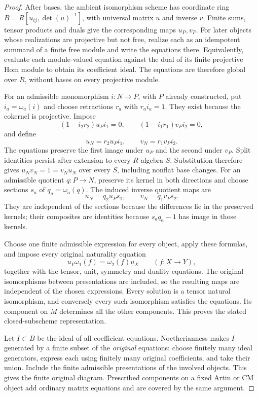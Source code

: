 \begin{proof}
After bases, the ambient isomorphism scheme has coordinate ring
$B=R[u_{ij},\det(u)^{-1}]$, with universal matrix $u$ and inverse
$v$. Finite sums, tensor products and duals give the corresponding
maps $u_P,v_P$. For later objects whose realizations are projective
but not free, realize each as an idempotent summand of a finite
free module and write the equations there. Equivalently, evaluate
each module-valued equation against the dual of its finite
projective Hom module to obtain its coefficient ideal. The
equations are therefore global over $R$, without bases on every
projective module.

For an admissible monomorphism $i:N\to P$, with $P$ already
constructed, put $i_a=\omega_a(i)$ and choose retractions $r_a$
with $r_ai_a=1$. They exist because the cokernel is projective.
Impose
\[
 (1-i_2r_2)u_Pi_1=0,\qquad
 (1-i_1r_1)v_Pi_2=0,
 \tag{E.2.12a}
\]
and define
\[
 u_N=r_2u_Pi_1,\qquad v_N=r_1v_Pi_2.
 \tag{E.2.12b}
\]
The equations preserve the first image under $u_P$ and the
second under $v_P$. Split identities persist after extension to
every $R$-algebra $S$. Substitution therefore gives
$u_Nv_N=1=v_Nu_N$ over every $S$, including nonflat base changes.
For an admissible quotient $q:P\to N$, preserve its kernel in
both directions and choose sections $s_a$ of $q_a=\omega_a(q)$.
The induced inverse quotient maps are
\[
 u_N=q_2u_Ps_1,\qquad v_N=q_1v_Ps_2.
 \tag{E.2.12c}
\]
They are independent of the sections because the differences
lie in the preserved kernels; their composites are identities
because $s_aq_a-1$ has image in those kernels.

Choose one finite admissible expression for every object, apply
these formulas, and impose every original naturality equation
\[
 u_Y\omega_1(f)=\omega_2(f)u_X\qquad(f:X\to Y),
 \tag{E.2.12d}
\]
together with the tensor, unit, symmetry and duality equations.
The original isomorphisms between presentations are included, so
the resulting maps are independent of the chosen expressions.
Every solution is a tensor natural isomorphism, and conversely
every such isomorphism satisfies the equations. Its component on
$M$ determines all the other components. This proves the stated
closed-subscheme representation.

Let $I\subset B$ be the ideal of all coefficient equations.
Noetherianness makes $I$ generated by a finite subset of the
\emph{original} equations: choose finitely many ideal generators,
express each using finitely many original coefficients, and take
their union. Include the finite admissible presentations of the
involved objects. This gives the finite original diagram.
Prescribed components on a fixed Artin or CM object add ordinary
matrix equations and are covered by the same argument.


\end{proof}
